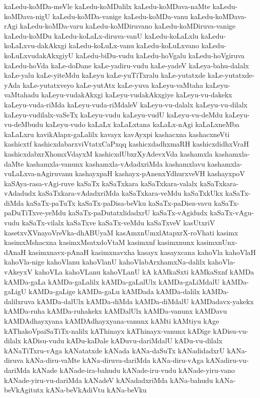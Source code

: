 {kaLedu-koMDa-meVle
kaLedu-koMDalilx
kaLedu-koMDava-naMte
kaLedu-koMDava-nigU
kaLedu-koMDa-vanige
kaLedu-koMDa-vanu
kaLedu-koMDava-rAgi
kaLedu-koMDa-varu
kaLedu-koMDiruvano
kaLedu-koMDiruva-vanige
kaLedu-koMDu
kaLedu-koLaLx-diruva-vanU
kaLedu-koLaLxlu
kaLedu-koLaLxvu-dakAkxgi
kaLedu-koLuLx-vanu
kaLedu-koLuLxvano
kaLedu-koLuLxvudakAkxgiyU
kaLedu-biDu-vudu
kaLedu-hoVgalu
kaLedu-hoVgiruva
kaLedu-hoVda
kaLe-doDane
kaLe-yadiru-vudu
kaLe-yadeV
kaLeya-bahu-dalalx
kaLe-yalu
kaLe-yiteMdu
kaLeyu
kaLe-yuTiTxralu
kaLe-yutatxde
kaLe-yutatxde-yAda
kaLe-yutatxveyo
kaLe-yutAtx
kaLe-yuva
kaLeyu-vaMtaha
kaLeyu-vaMtahadu
kaLeyu-vudakAkxgi
kaLeyu-vudakAkxgiye
kaLeyu-vu-dakekx
kaLeyu-vuda-riMda
kaLeyu-vuda-riMdaleV
kaLeyu-vu-dalalx
kaLeyu-vu-dilalx
kaLeyu-vudilalx-vaSeTx
kaLeyu-vudu
kaLeyu-vudU
kaLeyu-vu-deMdu
kaLeyu-vu-deMbudu
kaLeyu-vudo
kaLaLx
kaLaLxtana
kaLaLx-nAgi
kaLaLxneMba
kaLaLxru
kavikAlapx-gaLalilx
kavayx
kavAyxpi
kashacxna
kashacxneVti
kashicxtf
kashicxdabarxviVtatxCaPxqq
kashicxdadhxmaRH
kashicxdidhxVraH
kashicxdabxrXhomxVdayxM
kashicxdUbxrXyAdevxVda
kashamxla
kashamxla-daMte
kashamxla-vanunx
kashamxla-vAdadxriMda
kashamxlavu
kashamxla-vuLaLxva-nAgiruvanu
kashayxpaH
kashayx-pAnenxYdhurxveVH
kashayxpoV
kaSAya-rasa-vAgi-ruve
kaSaTx
kaSaTxkara
kaSaTxkara-valalx
kaSaTxkara-vAdadudx
kaSaTxkara-vAdadxriMda
kaSaTxkara-veMdu
kaSaTxkUkx
kaSaTx-diMda
kaSaTx-paTuTx
kaSaTx-paDisa-beVku
kaSaTx-paDisu-vavu
kaSaTx-paDuTiTxve-yeMdu
kaSaTx-paDutatxlidadxrU
kaSaTx-vAgidudx
kaSaTx-vAgu-vudu
kaSaTx-vilalx
kaSaTxve
kaSaTx-veMdu
kaSaTxveV
kasUtxriV
kasetxvXVnayoVreVka-dhABUyaM
kasAmxnUmxlAtapxrX-roVhati
kasimx
kasimxMshacxna
kasimxMsatxdoVtaM
kasimxnf
kasimxnunx
kasimxnUnx-dAnaH
kasimxnavx-pAnaH
kasimxnavxha
kasayx
kasayxcana
kahoVla
kahoVlaH
kahoVla-nige
kahoVlanu
kahoVlanU
kahoVlabArxhamxNa-dalilx
kahoVla-vAkeyxV
kahoVLa
kahoVLanu
kahoVLanU
kA
kAMkaSxti
kAMkaSxnf
kAMDa
kAMDa-gaLa
kAMDa-gaLalilx
kAMDa-gaLalUlx
kAMDa-gaLiMdalU
kAMDa-gaLigU
kAMDa-gaLige
kAMDa-gaLu
kAMDada
kAMDa-dalilx
kAMDa-dalilxruva
kAMDa-dalUlx
kAMDa-diMda
kAMDa-diMdalU
kAMDadavx-yakekx
kAMDa-ruha
kAMDa-ruhakekx
kAMDalUlx
kAMDa-vanunx
kAMDavu
kAMDAdhayxyana
kAMDAdhayxyana-vanunx
kAMti
kAMtiyu
kAge
kAThakoVpaiSaTiTx-nalilx
kAThinayx
kAThinayx-vanunx
kADige
kADisu-vu-dilalx
kADisu-vudu
kADu-kaDale
kADuvu-dariMdalU
kADu-vu-dilalx
kANaTiTxru-vAga
kANatatxde
kANada
kANa-daSuTx
kANadidadxrU
kANa-diruva
kANa-diru-vaMte
kANa-diruva-dariMda
kANa-diru-vAga
kANadiru-vu-dariMda
kANade
kANade-ira-bahudu
kANade-iru-vudu
kANade-yiru-vano
kANade-yiru-vu-dariMda
kANadeV
kANadadxriMda
kANa-bahudu
kANa-beVkAgitutx
kANa-beVkAdiVtu
kANa-beVku
}
